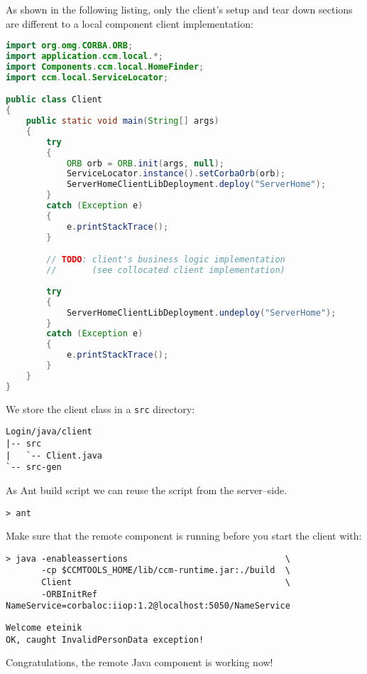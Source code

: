 \vspace{3mm}
As shown in the following listing, only the client's setup and tear down
sections are different to a local component client implementation:
\begin{footnotesize}
\begin{lstlisting}[language=Java]
import org.omg.CORBA.ORB;
import application.ccm.local.*;
import Components.ccm.local.HomeFinder;
import ccm.local.ServiceLocator;

public class Client
{
    public static void main(String[] args)
    {
        try
        {
            ORB orb = ORB.init(args, null);
            ServiceLocator.instance().setCorbaOrb(orb);
            ServerHomeClientLibDeployment.deploy("ServerHome");
        }
        catch (Exception e)
        {
            e.printStackTrace();
        }

        // TODO: client's business logic implementation 
        //       (see collocated client implementation)
        
        try
        {
            ServerHomeClientLibDeployment.undeploy("ServerHome");
        }
        catch (Exception e)
        {
            e.printStackTrace();
        }
    }
}
\end{lstlisting}
\end{footnotesize}

We store the client class in a {\tt src} directory:
\begin{footnotesize}
\begin{verbatim}
Login/java/client
|-- src
|   `-- Client.java
`-- src-gen
\end{verbatim}
\end{footnotesize}

As Ant build script we can reuse the script from the server--side.
\begin{footnotesize}
\begin{verbatim}
> ant
\end{verbatim}
\end{footnotesize}

Make sure that the remote component is running before you start the client with:
\begin{footnotesize}
\begin{verbatim}
> java -enableassertions                               \
       -cp $CCMTOOLS_HOME/lib/ccm-runtime.jar:./build  \
       Client                                          \
       -ORBInitRef NameService=corbaloc:iiop:1.2@localhost:5050/NameService
\end{verbatim}
\end{footnotesize}

\begin{footnotesize}
\begin{verbatim}
Welcome eteinik
OK, caught InvalidPersonData exception!
\end{verbatim}
\end{footnotesize}
Congratulations, the remote Java component is working now!

\newpage
